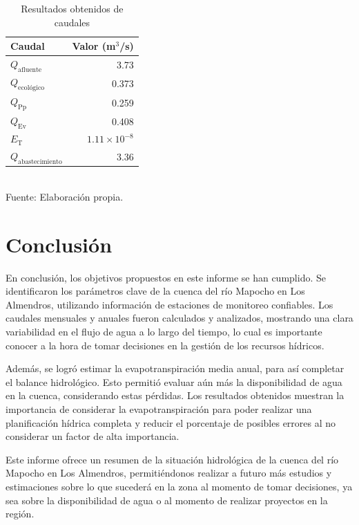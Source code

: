 \documentclass{article} %
\begin{document}
\begin{table}[h]
    \centering
    \caption{Resultados obtenidos de caudales}
    \vspace{0.2cm}
    \begin{tabular}{lr}
        \toprule
        \textbf{Caudal} & \textbf{Valor (m\(^3\)/s)} \\
        \midrule
        \(Q_{\text{afluente}}\) & 3.73 \\
        \(Q_{\text{ecológico}}\) & 0.373 \\
        \(Q_{\text{Pp}}\) & 0.259 \\
        \(Q_{\text{Ev}}\) & 0.408 \\
        \(E_{\text{T}}\) & \(1.11 \times 10^{-8}\) \\
        \(Q_{\text{abastecimiento}}\) & 3.36 \\
        \bottomrule
    \end{tabular}
    \vspace{0.2cm}
    \\Fuente: Elaboración propia.
\end{table}

\newpage
\section{Conclusión}
En conclusión, los objetivos propuestos en este informe se han cumplido. Se identificaron los parámetros clave de la cuenca del río Mapocho en Los Almendros, utilizando información de estaciones de monitoreo confiables. Los caudales mensuales y anuales fueron calculados y analizados, mostrando una clara variabilidad en el flujo de agua a lo largo del tiempo, lo cual es importante conocer a la hora de tomar decisiones en la gestión de los recursos hídricos.

Además, se logró estimar la evapotranspiración media anual, para así completar el balance hidrológico. Esto permitió evaluar aún más la disponibilidad de agua en la cuenca, considerando estas pérdidas. Los resultados obtenidos muestran la importancia de considerar la evapotranspiración para poder realizar una planificación hídrica completa y reducir el porcentaje de posibles errores al no considerar un factor de alta importancia.

Este informe ofrece un resumen de la situación hidrológica de la cuenca del río Mapocho en Los Almendros, permitiéndonos realizar a futuro más estudios y estimaciones sobre lo que sucederá en la zona al momento de tomar decisiones, ya sea sobre la disponibilidad de agua o al momento de realizar proyectos en la región.

\newpage
\end{document}
